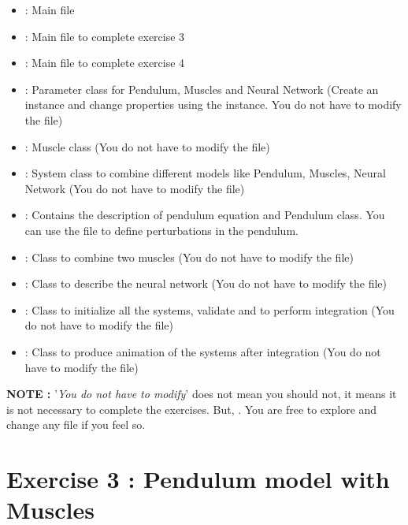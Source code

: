 \documentclass{cmc}
\begin{document}
\begin{itemize}
\item {} : Main file
\item {} : Main file to complete exercise 3
\item {} : Main file to complete exercise 4
\item {} : Parameter class for Pendulum,
  Muscles and Neural Network (Create an instance and change properties
  using the instance. You do not have to modify the file)
\item {} : Muscle class (You do not have to modify
  the file)
\item {} : System class to combine different models
  like Pendulum, Muscles, Neural Network (You do not have to modify
  the file)
\item {} : Contains the description of
  pendulum equation and Pendulum class. You can use the file to define
  perturbations in the pendulum.
\item {} : Class to combine two muscles (You do
  not have to modify the file)
\item {} : Class to describe the neural network
  (You do not have to modify the file)
\item {} : Class to initialize all the
  systems, validate and to perform integration (You do not have to
  modify the file)
\item {} : Class to produce animation of the
  systems after integration (You do not have to modify the file)
\end{itemize}

\textbf{NOTE : } '\textit{You do not have to modify}' does not mean
you should not, it means it is not necessary to complete the
exercises. But, . You are free to explore
and change any file if you feel so.

\section*{Exercise 3 : Pendulum model with Muscles}
\label{sec:question-1}
\end{document}
